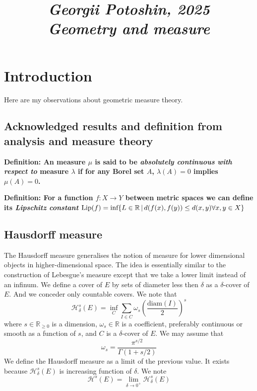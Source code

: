 \documentclass{article}
\begin{document}
\title{
\textit{\small{Georgii Potoshin, 2025}}\\
\vspace{0.3ex}
\textit{\huge{Geometry and measure}}\vspace{1ex}
}
\date{\vspace{-5ex}}
\maketitle


\date{\vspace{-10ex}}

\maketitle

\section{Introduction}
Here are my observations about geometric measure theory.

\subsection{Acknowledged results and definition from analysis and measure theory}
\textbf{Definition: An measure $\mu$ is said to be \emph{absolutely continuous
with respect to} measure $\lambda$ if for any Borel set $A$, $\lambda(A)=0$
implies $\mu(A)=0$.}

\vspace{1ex}
\textbf{Definition: For a function $f:X\rightarrow Y$ between metric spaces we can
define its \emph{Lipschitz constant} $\text{Lip}(f) = \textnormal{inf}\{L\in
\mathbb{R}\,|\,d(f(x),f(y))\leq d(x,y) \forall x,y\in X\}$}


\subsection{Hausdorff measure}
The Hausdorff measure generalises the notion of measure for lower dimensional
objects in higher-dimensional space. The idea is essentially similar to the
construction of Lebesgue's measure except that we take a lower limit instead of
an infinum. We define a cover of $E$ by sets of diameter less then $\delta$ as
a $\delta$-cover of $E$. And we conceder only countable covers. We note that
\[\mathcal{H}_\delta^s(E)=\inf_{C}\sum_{I\in C}\omega_s\left(\frac{\text{diam}(I)}{2}\right)^s\]
where $s\in\mathbb{R}_{\geq 0}$ is a dimension, $\omega_s\in\mathbb{R}$ is a
coefficient, preferably continuous or smooth as a function of $s$, and $C$ is a
$\delta$-cover of $E$. We may assume that
\[\omega_s = \frac{\pi^{s/2}}{\Gamma(1+s/2)}\]
We define the Hausdorff measure as a limit of the previous value. It exists
because $\mathcal{H}_\delta^s(E)$ is increasing function of $\delta$. We note
\[\mathcal{H}^s(E)=\lim_{\delta\rightarrow0^+}\mathcal{H}^s_\delta(E)\]
\end{document}
